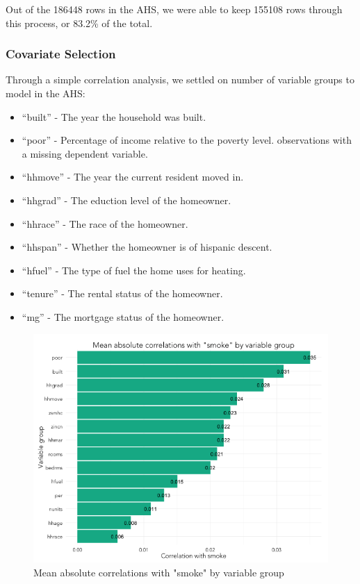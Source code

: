 \documentclass{sig-alternate}
\begin{document}
Out of the 186448 rows in the AHS, we were able to keep 155108 rows through this process, or 83.2\% of the total. 

\subsubsection{Covariate Selection}

Through a simple correlation analysis, we settled on number of variable groups to model in the AHS:

\begin{itemize} 
\item ``built'' - The year the household was built. 
\item ``poor'' - Percentage of income relative to the poverty level. observations with a missing dependent variable.
\item ``hhmove'' - The year the current resident moved in.
\item ``hhgrad'' - The eduction level of the homeowner.
\item ``hhrace'' - The race of the homeowner.
\item ``hhspan'' - Whether the homeowner is of hispanic descent.
\item ``hfuel'' - The type of fuel the home uses for heating. 
\item ``tenure'' - The rental status of the homeowner.
\item ``mg'' - The mortgage status of the homeowner.
\end{itemize}

\begin{figure}
\centering 
\includegraphics[scale=0.42]{explore-correlations-1-2.png}
\caption{Mean absolute correlations with "smoke" by variable group}
\end{figure}
\end{document}
